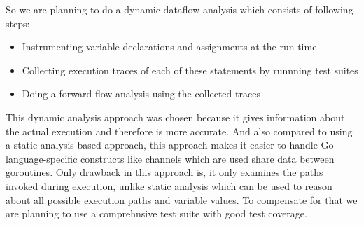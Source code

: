 So we are planning to do a dynamic dataflow analysis which consists of following steps:
\begin{itemize}
\item Instrumenting variable declarations and assignments at the run time
\item Collecting execution traces of each of these statements by runnning test suites
\item Doing a forward flow analysis using the collected traces
\end{itemize}

This dynamic analysis approach was chosen because it gives information about the actual execution and therefore is more accurate. And also compared to using a static analysis-based approach, this approach makes it easier to handle Go language-specific constructs like channels which are used share data between goroutines. Only drawback in this approach is, it only examines the paths invoked during execution, unlike static analysis which can be used to reason about all possible execution paths and variable values. To compensate for that we are planning to use a comprehnsive test suite with good test coverage.




